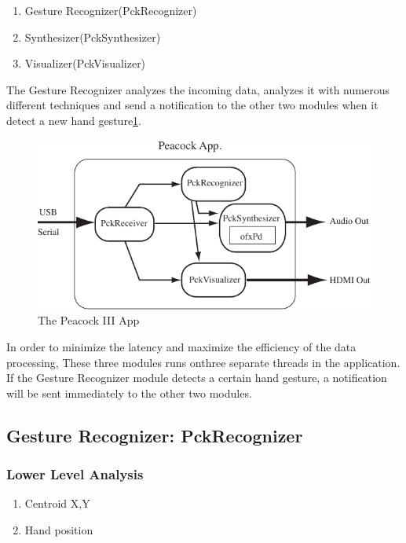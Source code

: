 \documentclass{nime-alternate}
\begin{document}
\begin{enumerate}
       \item Gesture Recognizer(PckRecognizer)
       \item Synthesizer(PckSynthesizer)
       \item Visualizer(PckVisualizer)
\end{enumerate}

The Gesture Recognizer analyzes the incoming data, analyzes it with numerous different techniques and send a notification to the other two modules when it detect a new hand gesture\ref{fig:modules}.


\begin{figure}[htbp]
       \centering
              \includegraphics[width=1\columnwidth]{Peacock_app}
       \caption{The Peacock III App}
       \label{fig:modules}
\end{figure}

In order to minimize the latency and maximize the efficiency of the data processing, These three modules runs onthree separate threads in the application. If the Gesture Recognizer module detects a certain hand gesture, a notification will be sent immediately to the other two modules.


\subsection{Gesture Recognizer: PckRecognizer}

\subsubsection{Lower Level Analysis}

\begin{enumerate}
       \item Centroid X,Y
       \item Hand position
\end{enumerate}
\end{document}
